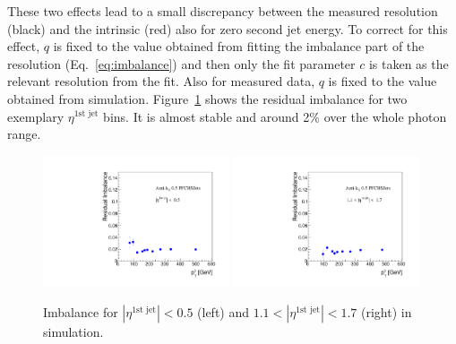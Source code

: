 These two effects lead to a small discrepancy between the measured resolution (black) and the intrinsic (red) also for zero second jet energy. 
To correct for this effect,  $q$ is fixed to the value obtained 
from fitting the imbalance part of the resolution (Eq.~\eqref{eq:imbalance}) and then only the fit parameter  $c$ is taken as the relevant resolution from the fit.
Also for measured data, $q$ is fixed to the value obtained from simulation. 
Figure~\ref{fig:ImbalanceOfPtgamma} shows the residual imbalance for two exemplary $\eta^{\text{1st jet}}$ bins. 
It is almost stable and around 2\% over the whole photon \pt range.
\begin{figure}[!b]
  \centering
    \includegraphics[width=0.49\textwidth]{figures/resolution/methodology/Imbalance_for_1_eta_bin_PFCHS_mc_RMS99.pdf}
    \includegraphics[width=0.49\textwidth]{figures/resolution/methodology/Imbalance_for_3_eta_bin_PFCHS_mc_RMS99.pdf}
  \caption{Imbalance for $|\eta^{\text{1st jet}}| < 0.5$ (left) and $1.1<|\eta^{\text{1st jet}}| < 1.7$ (right) in simulation.}  
  \label{fig:ImbalanceOfPtgamma}
\end{figure}

